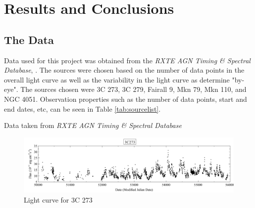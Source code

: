 \documentclass[12pt, oneside]{smuthesis}
\begin{document}
\chapter{\sc Results and Conclusions} \label{resultsConclusions}

\section{\sc The Data} \label{theData}

Data used for this project was obtained from the \textit{RXTE AGN Timing \& Spectral Database}, \cite{rxtepaper}. The sources were chosen based on the number of data points in the overall light curve as well as the variability in the light curve as determine "by-eye". The sources chosen were 3C 273, 3C 279, Fairall 9, Mkn 79, Mkn 110, and NGC 4051. Observation properties such as the number of data points, start and end dates, etc, can be seen in Table \ref{tab:sourcelist}. 

\begin{minipage}{\linewidth}
	\centering
	\label{tab:sourcelist}
	\par
	\bigskip
	Data taken from \textit{RXTE AGN Timing \& Spectral Database}
\end{minipage}

\begin{figure}[H]
	\centering
	\includegraphics[width=\linewidth]{3C273lightcurve}
	\caption{Light curve for 3C 273}
	\label{fig:3c273lc}
\end{figure}
\end{document}
